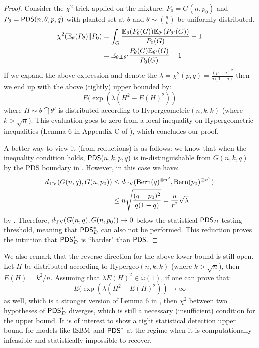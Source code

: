 \documentclass[final,12pt]{colt2023} %
\newcommand\1[1]{\mathbb{I}_{\left\{#1\right\}}}
\begin{document}
\begin{proof}
Consider the $\chi^2$ trick applied on the mixture: $P_0=G(n, p_0)$ and $P_{\theta}=\mathsf{PDS}(n,\theta, p, q)$ with planted set at $\theta$ and $\theta\sim{n\choose k}$ be uniformly distributed.
\begin{align*}
    \chi^2(\mathbb{E}_{\theta}(P_{\theta})\|P_0)&=\int_G \frac{\mathbb{E}_{\theta}(P_{\theta}(G))\mathbb{E}_{\theta'}(P_{\theta'}(G))}{P_0(G)}-1\\
    &=\mathbb{E}_{\theta\indep\theta'}\frac{P_{\theta}(G)\mathbb{E}_{\theta'}(G)}{P_0(G)}-1
\end{align*}
If we expand the above expression and denote the $\lambda=\chi^2(p, q)=\frac{(p-q)^2}{q(1-q)}$ then we end up with the above (tightly) upper bounded by:
$$E(\exp (\lambda (H^2-E(H)^2))$$where $H\sim \theta\bigcap\theta'$ is distributed according to Hypergeometric$(n, k, k)$ (where $k>\sqrt{n}$). This evaluation goes to zero from a local inequality on Hypergeometric inequalities (Lemma 6 in Appendix C of \cite{HWX15}), which concludes our proof.

\spac A better way to view it (from reductions) is as follows: we know that when the inequality condition holds, $\mathsf{PDS}(n, k, p, q)$ is in-distinguishable from $G(n, k, q)$ by the PDS boundary in \cite{BBH18}. However, in this case we have:
\begin{align*}
    d_{\rm TV}(G(n, q), G(n, p_0))&\leq d_{\rm TV}({\rm Bern}(q)^{\otimes n^2},{\rm Bern}(p_0)^{\otimes n^2})\\
    &\leq n\sqrt{\frac{(q-p_0)^2}{q(1-q)}}=\frac{n}{r^2}\sqrt{\lambda}
\end{align*}
by . Therefore, $d_{\rm TV}(G(n, q), G(n, p_0))\to 0$ below the statistical $\mathsf{PDS}_D$ testing threshold, meaning that $\mathsf{PDS}^*_D$ can also not be performed. This reduction proves the intuition that $\mathsf{PDS}^*_D$ is ``harder" than $\mathsf{PDS}$.\end{proof}
\begin{remark}
We also remark that the reverse direction for the above lower bound is still open. Let $H$ be distributed according to Hypergeo$(n, k, k)$ (where $k>\sqrt{n}$), then $E(H)=k^2/n$. Assuming that $\lambda E(H)^2\in \tilde\omega(1)$, if one can prove that:
$$E(\exp (\lambda (H^2-E(H)^2))\to\infty$$as well, which is a stronger version of Lemma 6 in \cite{HWX15}, then $\chi^2$ between two hypotheses of $\mathsf{PDS}^*_D$ diverges, which is still a necessary (insufficient) condition for the upper bound. It is of interest to show a tight statistical detection upper bound for models like $\textup{ISBM}$ and $\mathsf{PDS}^*$ at the regime when it is computationally infeasible and statistically impossible to recover.
\end{remark} 
\end{document}
